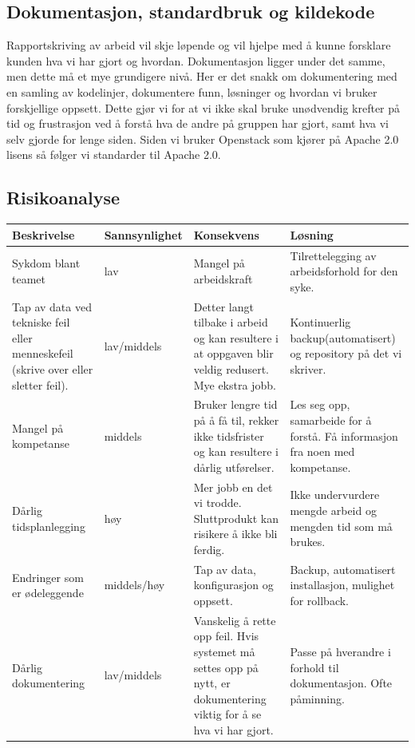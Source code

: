 \documentclass[12pt,a4paper]{article}
\begin{document}
\subsection{Dokumentasjon, standardbruk og kildekode}
Rapportskriving av arbeid vil skje løpende og vil hjelpe med å kunne forsklare kunden hva vi har gjort og hvordan. \newline \newline
Dokumentasjon ligger under det samme, men dette må et mye grundigere nivå. Her er det snakk om dokumentering med en samling av kodelinjer, dokumentere funn, løsninger og hvordan vi bruker forskjellige oppsett. Dette gjør vi for at vi ikke skal bruke unødvendig krefter på tid og frustrasjon ved å forstå hva de andre på gruppen har gjort, samt hva vi selv gjorde for lenge siden. \newline \newline
Siden vi bruker Openstack som kjører på Apache 2.0 lisens så følger vi standarder til Apache 2.0.

\newpage
\subsection{Risikoanalyse}
\begin{table}[h]
	\begin{tabular}[Figur 1]{| p{3cm} | p{3cm} | p{5cm} | p{5cm} |}
		\hline \rowcolor{lightgray} \textbf{Beskrivelse} & \textbf{Sannsynlighet} & \textbf{Konsekvens} & \textbf{Løsning} \\
		\hline \rowcolor{darkgray} Sykdom blant teamet & lav & Mangel på arbeidskraft & Tilrettelegging av arbeidsforhold for den syke. \\
		\hline \rowcolor{lightgray} Tap av data ved tekniske feil eller menneskefeil (skrive over eller sletter feil). &	lav/middels &	Detter langt tilbake i arbeid og kan resultere i at  oppgaven blir veldig redusert. Mye ekstra jobb. & Kontinuerlig backup(automatisert) og repository på det vi skriver. \\
		\hline \rowcolor{darkgray} Mangel på kompetanse &	middels & Bruker lengre tid på å få til, rekker ikke tidsfrister og kan resultere i dårlig utførelser. & Les seg opp, samarbeide for å forstå. Få  informasjon fra noen med kompetanse. \\
		\hline \rowcolor{lightgray} Dårlig tidsplanlegging & høy & Mer jobb en det vi trodde. Sluttprodukt kan risikere å ikke bli ferdig. & Ikke undervurdere mengde arbeid og mengden tid som må brukes. \\
		\hline \rowcolor{darkgray} Endringer som er ødeleggende &	middels/høy	 & Tap av data, konfigurasjon og oppsett. & Backup, automatisert installasjon, mulighet for rollback. \\
		\hline \rowcolor{lightgray} Dårlig dokumentering & lav/middels & Vanskelig å rette opp feil. Hvis systemet må settes opp på nytt, er dokumentering viktig for å se hva vi har gjort. & Passe på hverandre i forhold til dokumentasjon. Ofte påminning.
	\end{tabular}
\end{table}
\end{document}
